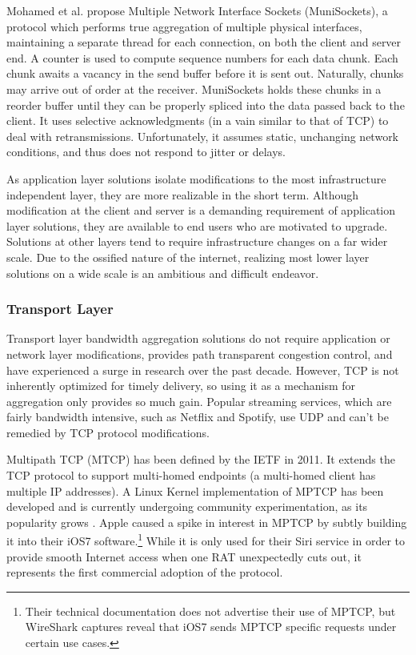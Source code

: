 \documentclass[12pt]{article}
\begin{document}
		Mohamed et al. propose Multiple Network Interface Sockets (MuniSockets), a protocol which performs true aggregation of multiple physical interfaces, maintaining a separate thread for each connection, on both the client and server end. A counter is used to compute sequence numbers for each data chunk. Each chunk awaits a vacancy in the send buffer before it is sent out. Naturally, chunks may arrive out of order at the receiver. MuniSockets holds these chunks in a reorder buffer until they can be properly spliced into the data passed back to the client. It uses selective acknowledgments (in a vain similar to that of TCP) to deal with retransmissions. Unfortunately, it assumes static, unchanging network conditions, and thus does not respond to jitter or delays\cite{mohamed2002user}.

		As application layer solutions isolate modifications to the most infrastructure independent layer, they are more realizable in the short term. Although modification at the client and server is a demanding requirement of application layer solutions, they are available to end users who are motivated to upgrade. Solutions at other layers tend to require infrastructure changes on a far wider scale. Due to the ossified nature of the internet, realizing most lower layer solutions on a wide scale is an ambitious and difficult endeavor.

	\subsubsection{Transport Layer}

		Transport layer bandwidth aggregation solutions do not require application or network layer modifications, provides path transparent congestion control, and have experienced a surge in research over the past decade\cite{5763587}. However, TCP is not inherently optimized for timely delivery, so using it as a mechanism for aggregation only provides so much gain. Popular streaming services, which are fairly bandwidth intensive, such as Netflix and Spotify, use UDP and can't be remedied by TCP protocol modifications.

		Multipath TCP (MTCP) has been defined by the IETF in 2011. It extends the TCP protocol to support multi-homed endpoints (a multi-homed client has multiple IP addresses). A Linux Kernel implementation of MPTCP has been developed and is currently undergoing community experimentation, as its popularity grows \cite{barre2011multipath}. Apple caused a spike in interest in MPTCP by subtly building it into their iOS7 software.\footnote{Their technical documentation does not advertise their use of MPTCP, but WireShark captures reveal that iOS7 sends MPTCP specific requests under certain use cases.} While it is only used for their Siri service in order to provide smooth Internet access when one RAT unexpectedly cuts out, it represents the first commercial adoption of the protocol.
\end{document}
